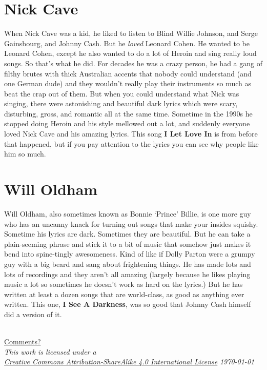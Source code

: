 \documentclass[letterpaper,single]{article}
\begin{document}
\section{Nick Cave}
When Nick Cave was a kid, he liked to listen to Blind Willie Johnson, and Serge Gainsbourg, and Johnny Cash. 
But he \emph{loved} Leonard Cohen. 
He wanted to be Leonard Cohen, except he also wanted to do a lot of Heroin and sing really loud songs. 
So that's what he did. 
For decades he was a crazy person, he had a gang of filthy brutes with thick Australian accents that nobody could understand (and one German dude) and they wouldn't really play their instruments so much as beat the crap out of them. 
But when you could understand what Nick was singing, there were astonishing and beautiful dark lyrics which were scary, disturbing, gross, and romantic all at the same time. 
Sometime in the 1990s he stopped doing Heroin and his style mellowed out a lot, and suddenly everyone loved Nick Cave and his amazing lyrics.
This song \textbf{I Let Love In} is from before that happened, but if you pay attention to the lyrics you can see why people like him so much.

\section{Will Oldham}
Will Oldham, also sometimes known as Bonnie `Prince' Billie, is one more guy who has an uncanny knack for turning out songs that make your insides squishy. 
Sometime his lyrics are dark. 
Sometimes they are beautiful. 
But he can take a plain-seeming phrase and stick it to a bit of music that somehow just makes it bend into spine-tingly awesomeness. 
Kind of like if Dolly Parton were a grumpy guy with a big beard and sang about frightening things.
He has made lots and lots of recordings and they aren't all amazing (largely because he likes playing music a lot so sometimes he doesn't work as hard on the lyrics.) 
But he has written at least a dozen songs that are world-class, as good as anything ever written. This one, \textbf{I See A Darkness}, was so good that Johnny Cash himself did a version of it.
\\
\\

\begin{center}
  \small
  \href{mailto://kunstcleaver@gmail.com}{Comments?}\\
  \textit{This work is licensed under a \\\href{http://creativecommons.org/licenses/by-sa/4.0/}{Creative Commons Attribution-ShareAlike 4.0 International License}}
  \textit{\today}\\
\end{center}
\end{document}
